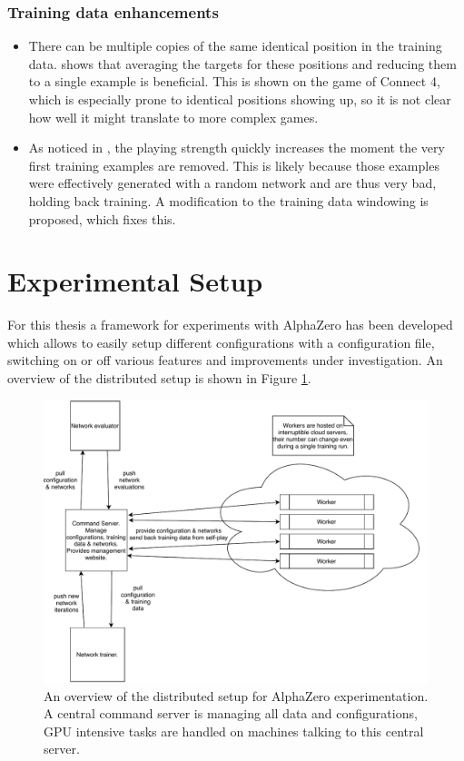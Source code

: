 \documentclass[12pt,onecolumn,oneside,titlepage]{article}
\begin{document}
\subsubsection{Training data enhancements}
\begin{itemize}
 \item There can be multiple copies of the same identical position in the training data. \cite{oracledevs6} shows that averaging the targets for these positions and reducing them to a single example is beneficial. This is shown on the game of Connect 4,
 which is especially prone to identical positions showing up, so it is not clear how well it might translate to more complex games.
 \item As noticed in \cite{oracledevs6}, the playing strength quickly increases the moment the very first training examples are removed. This is likely because those examples were effectively generated with a random network and are thus very bad, holding back training.
 A modification to the training data windowing is proposed, which fixes this.
\end{itemize}





\section{Experimental Setup} \label{s:experiments}

For this thesis a framework for experiments with AlphaZero has been developed which allows to easily setup different configurations with a configuration file, switching on or off various features and improvements under investigation.
An overview of the distributed setup is shown in Figure \ref{fig:x0_framework_overview}.

\begin{figure}[H]
\centering
\includegraphics[clip,width=\columnwidth]{x0_framework_overview}
\caption{An overview of the distributed setup for AlphaZero experimentation. A central command server is managing all data and configurations, GPU intensive tasks are handled on machines talking to this central server.}
\label{fig:x0_framework_overview}
\end{figure}
\end{document}
